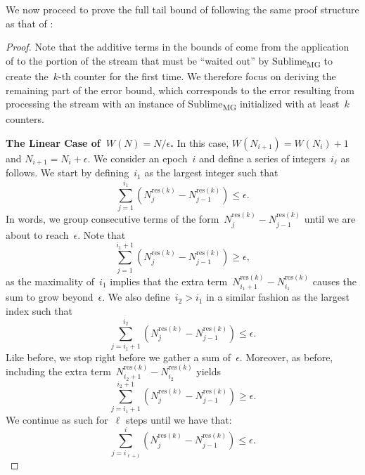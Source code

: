 \documentclass[sigconf]{acmart}
\newcommand{\sketch}{Sublime}
\newcommand{\sketchmg}{\sketch\textsubscript{MG}\xspace}
\newcommand{\parentheses}[1]{\left(#1\right)}
\begin{document}
We now proceed to prove the full tail bound of  following the
same proof structure as that of :
\thmmgres*
\begin{proof}
    Note that the additive terms in the bounds of  come from
    the application of  to the portion of the stream that
    must be ``waited out'' by \sketchmg to create the~$k${\nobreakdash-}th
    counter for the first time. We therefore focus on deriving the remaining
    part of the error bound, which corresponds to the error resulting from
    processing the stream with an instance of \sketchmg initialized with at
    least~$k$ counters.

    \textbf{The Linear Case of~$W(N)=N/\epsilon$.} 
    In this case, $W(N_{i+1})=W(N_i)+1$ and $N_{i+1}=N_i +
    \epsilon$. We consider an epoch~$i$ and define a series of
    integers~$i_\ell$ as follows. We start by defining~$i_1$ as the largest
    integer such that
    $$ \sum_{j=1}^{i_1} \parentheses{N^{\text{res}(k)}_j- N^{\text{res}(k)}_{j-1}} \leq \epsilon. $$
    In words, we group consecutive terms of the form~$N^{\text{res}(k)}_j-
    N^{\text{res}(k)}_{j-1}$ until we are about to reach~$\epsilon$. Note that
    $$ \sum_{j=1}^{i_1+1} \parentheses{N^{\text{res}(k)}_j- N^{\text{res}(k)}_{j-1}} \geq \epsilon, $$
    as the maximality of~$i_1$ implies that the extra
    term~$N^{\text{res}(k)}_{i_1+1}- N^{\text{res}(k)}_{i_1}$ causes the sum to
    grow beyond~$\epsilon$. We also define~$i_2 > i_1$ in a similar fashion as
    the largest index such that 
    $$ \sum_{j=i_1+1}^{i_2} \parentheses{N^{\text{res}(k)}_j - N^{\text{res}(k)}_{j-1}} \leq \epsilon. $$
    Like before, we stop right before we gather a sum of~$\epsilon$.
    Moreover, as before, including the extra
    term~$N_{i_2+1}^{\text{res}(k)}-N_{i_2}^{\text{res}(k)}$ yields
    $$ \sum_{j=i_{1}+1}^{i_2+1} \parentheses{N^{\text{res}(k)}_j- N^{\text{res}(k)}_{j-1}} \geq \epsilon. $$
    We continue as such for~$\ell$ steps until we have that:
    $$ \sum_{j=i_{\ell+1}}^{i} \parentheses{N^{\text{res}(k)}_j- N^{\text{res}(k)}_{j-1}} \leq \epsilon. $$


\end{proof}
\end{document}
